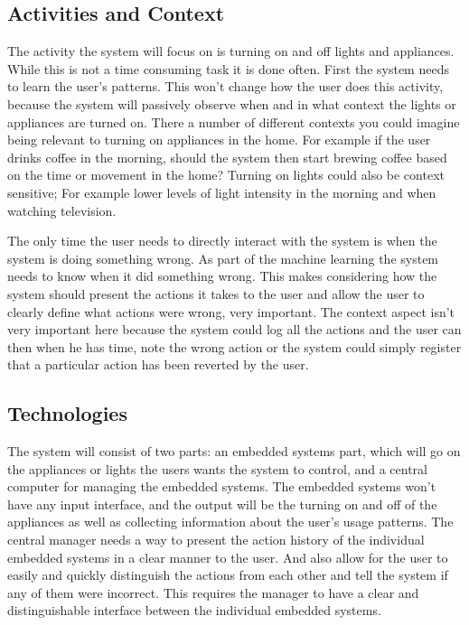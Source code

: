 \subsection{Activities and Context}
The activity the system will focus on is turning on and off lights and
appliances. While this is not a time consuming task it is done often. First the
system needs to learn the user's patterns. This won't change how the user does
this activity, because the system will passively observe when and in what
context the lights or appliances are turned on. There a number of different
contexts you could imagine being relevant to turning on appliances in the home.
For example if the user drinks coffee in the morning, should the system then
start brewing coffee based on the time or movement in the home? Turning on
lights could also be context sensitive; For example lower levels of light
intensity in the morning and when watching television.

The only time the user needs to directly interact with the system is when the
system is doing something wrong. As part of the machine learning the system
needs to know when it did something wrong. This makes considering how the system
should present the actions it takes to the user and allow the user to clearly
define what actions were wrong, very important. The context aspect isn't very
important here because the system could log all the actions and the user can
then when he has time, note the wrong action or the system could simply register
that a particular action has been reverted by the user.

\subsection{Technologies}
The system will consist of two parts: an embedded systems part, which will go on
the appliances or lights the users wants the system to control, and a central
computer for managing the embedded systems. The embedded systems won't have any
input interface, and the output will be the turning on and off of the appliances
as well as collecting information about the user's usage patterns. The central manager needs a way to present the action history of the individual embedded systems in a clear manner to the user. And also allow for the user to easily and quickly distinguish the actions from each other and tell the system if any of them were incorrect. This requires the manager to have a clear and distinguishable interface between the individual embedded systems.
